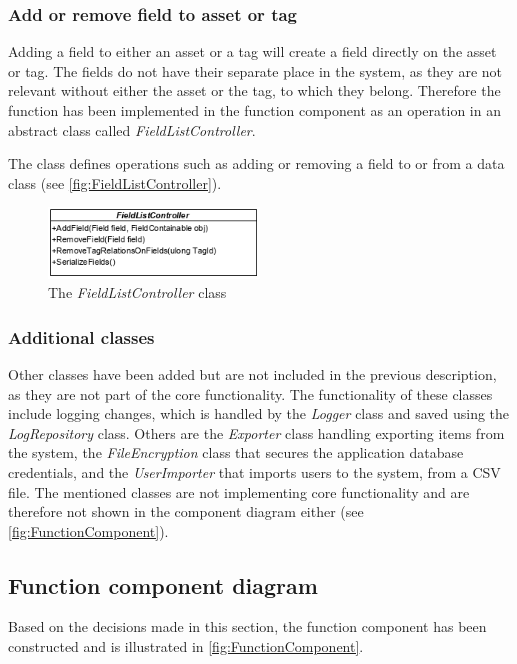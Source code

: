 \subsubsection{Add or remove field to asset or tag}
Adding a field to either an asset or a tag will create a field directly on the asset or tag. The fields do not have their separate place in the system, as they are not relevant without either the asset or the tag, to which they belong. Therefore the function has been implemented in the function component as an operation in an abstract class called \textit{FieldListController}.
\par
The class defines operations such as adding or removing a field to or from a data class (see \autoref{fig:FieldListController}).

\begin{figure}[H]
    \centering
    \includegraphics[width=0.5\textwidth]{figures/FunctionComponent/FieldListController.png}
    \caption{The \textit{FieldListController} class}
    \label{fig:FieldListController}
\end{figure}

\subsubsection{Additional classes}
Other classes have been added but are not included in the previous description, as they are not part of the core functionality. The functionality of these classes include logging changes, which is handled by the \textit{Logger} class and saved using the \textit{LogRepository} class. Others are the \textit{Exporter} class handling exporting items from the system, the \textit{FileEncryption} class that secures the application database credentials, and the \textit{UserImporter} that imports users to the system, from a CSV file. The mentioned classes are not implementing core functionality and are therefore not shown in the component diagram either (see \autoref{fig:FunctionComponent}).

\subsection{Function component diagram}
Based on the decisions made in this section, the function component has been constructed and is illustrated in \autoref{fig:FunctionComponent}.

